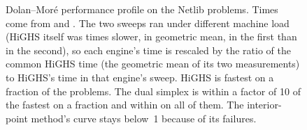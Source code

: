 \begin{figure}[tbp]
\centering
{}
\caption[Performance profile on Netlib]{Dolan--Moré performance profile on the \nProf{} Netlib
problems. Times come from \file{\spxFile} and \file{\ipmFile}. The two sweeps ran under different
machine load (HiGHS itself was \sweepLoadRatio{} times slower, in geometric mean, in the first than in
the second), so each engine's time is rescaled by the ratio of the common HiGHS time (the geometric
mean of its two measurements) to HiGHS's time in that engine's sweep. HiGHS is
fastest on a fraction \rhoOneHighs{} of the problems. The dual simplex is within a factor of 10 of the
fastest on a fraction \rhoTenSpx{} and within \tauAllSpx{} on all of them. The interior-point
method's curve stays below~1 because of its failures.}
\label{fig:profile}
\end{figure}


